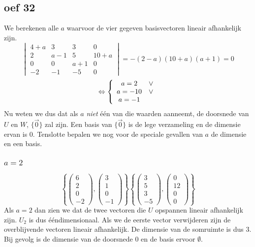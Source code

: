 \documentclass[lineaire_algebra_oplossingen.tex]{subfiles}
\begin{document}
\subsection{oef 32}
We berekenen alle $a$ waarvoor de vier gegeven basisvectoren lineair afhankelijk zijn.
\[
\begin{vmatrix}
4+a & 3 & 3 & 0\\
2 & a-1 & 5 & 10+a\\
0 & 0 & a+1 & 0\\
-2 & -1 & -5 & 0
\end{vmatrix}
= -(2-a)(10+a)(a+1)=0
\]
\[
\Leftrightarrow 
\left\lbrace
\begin{array}{c c}
a = 2 &\vee\\
a = -10 &\vee\\
a = -1\\
\end{array}
\right.
\]
Nu weten we dus dat als $a$ \textit{niet} \'e\'en van die waarden aanneemt, de doorsnede van $U$ en $W$, $\{\vec{0}\}$ zal zijn. Een basis van $\{\vec{0}\}$ is de lege verzameling en de dimensie ervan is $0$.
Tenslotte bepalen we nog voor de speciale gevallen van $a$ de dimensie en een basis.
\subsubsection*{$a = 2$}
\[
\left\lbrace
\begin{pmatrix}
6\\2\\0\\-2
\end{pmatrix}
,
\begin{pmatrix}
3\\1\\0\\-1
\end{pmatrix}
\right\rbrace
\left\lbrace
\begin{pmatrix}
3\\5\\3\\-5
\end{pmatrix}
,
\begin{pmatrix}
0\\12\\0\\0
\end{pmatrix}
\right\rbrace
\]
Als $a=2$ dan zien we dat de twee vectoren die $U$ opspannen lineair afhankelijk zijn. $U_2$ is dus \'e\'endimensionaal. Als we de eerste vector verwijderen zijn de overblijvende vectoren lineair afhankelijk. De dimensie van de somruimte is dus $3$. Bij gevolg is de dimensie van de doorsnede $0$ en de basis ervoor $\emptyset$.
\end{document}
